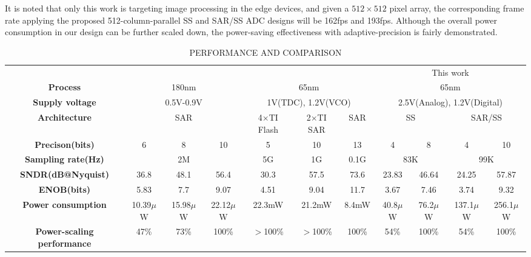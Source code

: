 It is noted that only this work is targeting image processing in the edge devices, and given a $512\times512$ pixel array, the corresponding frame rate applying the proposed 512-column-parallel SS and SAR/SS ADC designs will be 162fps and 193fps. Although the overall power consumption in our design can be further scaled down, the power-saving effectiveness with adaptive-precision is fairly demonstrated.


\begin{table}[htbp]
	\caption{PERFORMANCE AND COMPARISON}
	\begin{center}
		\begin{tabular}{|c|c|c|c|c|c|c|c|c|c|c|}
			\hline
			\textbf{}& \multicolumn{3}{|c|}{\cite{zhu_6--10-bit_2015}} & \multicolumn{3}{|c|}{\cite{el-halwagy_100-mss5-gss_2018}} & \multicolumn{4}{|c|}{This work} \\
			\hhline{|===========|}
			\textbf{Process}& \multicolumn{3}{|c|}{180nm} & \multicolumn{3}{|c|}{65nm} & \multicolumn{4}{|c|}{65nm} \\
			\hline 
			\textbf{Supply voltage}& \multicolumn{3}{|c|}{0.5V-0.9V} & \multicolumn{3}{|c|}{1V(TDC), 1.2V(VCO)} & \multicolumn{4}{|c|}{2.5V(Analog), 1.2V(Digital)} \\
			\hline
			
			\textbf{Architecture}& \multicolumn{3}{|c|}{SAR} & 4$\times$TI Flash & 2$\times$TI SAR & SAR & \multicolumn{2}{|c|}{SS} & \multicolumn{2}{|c|}{SAR/SS}\\
			\hline
			\textbf{Precison(bits)}& 6 & 8 & 10 & 5 & 10 & 13 & 4 & 8 & 4 & 10 \\
			\hline
			\textbf{Sampling rate(Hz)}& \multicolumn{3}{|c|}{2M} & 5G & 1G & 0.1G & \multicolumn{2}{|c|}{83K} & \multicolumn{2}{|c|}{99K} \\
			\hline
			\textbf{SNDR(dB@Nyquist)}& 36.8 & 48.1 & 56.4 & 30.3 & 57.5 & 73.6 & 23.83 & 46.64 & 24.25 & 57.87 \\
			\hline
			\textbf{ENOB(bits)}& 5.83 & 7.7 & 9.07 & 4.51 & 9.04 & 11.7 & 3.67 & 7.46 & 3.74 & 9.32 \\
			\hline
			\textbf{Power consumption}& 10.39$\mu$W & 15.98$\mu$W & 22.12$\mu$W & 22.3mW & 21.2mW & 8.4mW & 40.8$\mu$W & 76.2$\mu$W & 137.1$\mu$W & 256.1$\mu$W\\
			\hline
			\textbf{Power-scaling performance}& 47\% & 73\% & 100\% & $>$100\% & $>$100\% & 100\% & 54\% & 100\% & 54\% & 100\% \\
			\hline
		\end{tabular}
		\label{tab1}
	\end{center}
\end{table}